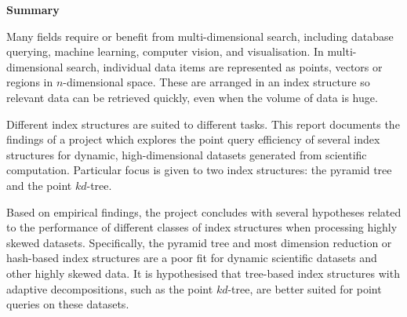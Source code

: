 \begin{center}
    {\LARGE\bf Summary}
\end{center}

Many fields require or benefit from multi-dimensional search, including database querying, machine learning, computer vision, and visualisation. In multi-dimensional search, individual data items are represented as points, vectors or regions in $n$-dimensional space. These are arranged in an index structure so relevant data can be retrieved quickly, even when the volume of data is huge.

Different index structures are suited to different tasks. This report documents the findings of a project which explores the point query efficiency of several index structures for dynamic, high-dimensional datasets generated from scientific computation. Particular focus is given to two index structures: the pyramid tree and the point $kd$-tree.

Based on empirical findings, the project concludes with several hypotheses related to the performance of different classes of index structures when processing highly skewed datasets. Specifically, the pyramid tree and most dimension reduction or hash-based index structures are a poor fit for dynamic scientific datasets and other highly skewed data. It is hypothesised that tree-based index structures with adaptive decompositions, such as the point $kd$-tree, are better suited for point queries on these datasets.